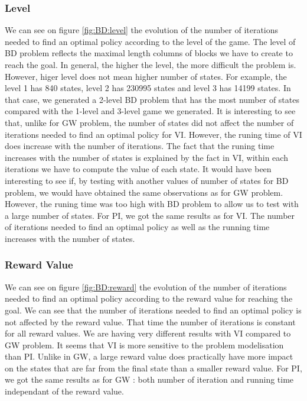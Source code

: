 \documentclass[10pt, twocolumn]{article}
\begin{document}
			\subsubsection*{Level}
				We can see on figure \ref{fig:BD:level} the evolution of the number of iterations needed to find an optimal policy according to the level of the game. The level of BD problem reflects the maximal length columns of blocks we have to create to reach the goal. In general, the higher the level, the more difficult the problem is. However, higer level does not mean higher number of states. For example, the level 1 has 840 states, level 2 has 230995 states and level 3 has 14199 states. In that case, we generated a 2-level BD problem that has the most number of states compared with the 1-level and 3-level game we generated. It is interesting to see that, unlike for GW problem, the number of states did not affect the number of iterations needed to find an optimal policy for VI. However, the runing time of VI does increase with the number of iterations. The fact that the runing time increases with the number of states is explained by the fact in VI, within each iterations we have to compute the value of each state. It would have been interesting to see if, by testing with another values of number of states for BD problem, we would have obtained the same observations as for GW problem. However, the runing time was too high with BD problem to allow us to test with a large number of states. For PI, we got the same results as for VI. The number of iterations needed to find an optimal policy as well as the running time increases with the number of states.
			\subsubsection*{Reward Value}
				We can see on figure \ref{fig:BD:reward} the evolution of the number of iterations needed to find an optimal policy according to the reward value for reaching the goal. We can see that the number of iterations needed to find an optimal policy is not affected by the reward value. That time the number of iterations is constant for all reward values. We are having very different results with VI compared to GW problem. It seems that VI is more sensitive to the problem modelisation than PI. Unlike in GW, a large reward value does practically have more impact on the states that are far from the final state than a smaller reward value. For PI, we got the same results as for GW : both number of iteration and running time independant of the reward value.
\end{document}
